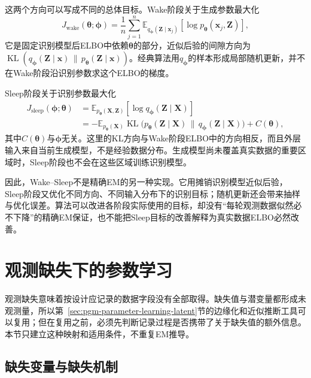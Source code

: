 这两个方向可以写成不同的总体目标。Wake阶段关于生成参数最大化
\begin{equation}
  J_{\mathrm{wake}}(\bm{\theta};\bm{\phi})
  =\frac{1}{n}\sum_{j=1}^n
    \mathbb{E}_{q_{\bm{\phi}}(\bm{Z}\mid\bm{x}_j)}
      [\log p_{\bm{\theta}}(\bm{x}_j,\bm{Z})],
  \label{eq:pgm-parameter-learning-wake-objective}
\end{equation}
它是固定识别模型后ELBO中依赖$\bm{\theta}$的部分，近似后验的间隙方向为$\operatorname{KL}(q_{\bm{\phi}}(\bm{Z}\mid\bm{x})\,\|\,p_{\bm{\theta}}(\bm{Z}\mid\bm{x}))$。经典算法用$q_{\bm{\phi}}$的样本形成局部随机更新，并不在Wake阶段沿识别参数求这个ELBO的梯度。

Sleep阶段关于识别参数最大化
\begin{equation}
  \begin{aligned}
    J_{\mathrm{sleep}}(\bm{\phi};\bm{\theta})
      &=\mathbb{E}_{p_{\bm{\theta}}(\bm{X},\bm{Z})}
          [\log q_{\bm{\phi}}(\bm{Z}\mid\bm{X})]\\
      &=-\mathbb{E}_{p_{\bm{\theta}}(\bm{X})}
          \operatorname{KL}\bigl(
            p_{\bm{\theta}}(\bm{Z}\mid\bm{X})
            \,\|\,q_{\bm{\phi}}(\bm{Z}\mid\bm{X})\bigr)+C(\bm{\theta}),
  \end{aligned}
  \label{eq:pgm-parameter-learning-sleep-objective}
\end{equation}
其中$C(\bm{\theta})$与$\bm{\phi}$无关。这里的KL方向与Wake阶段ELBO中的方向相反，而且外层输入来自当前生成模型，不是经验数据分布。生成模型尚未覆盖真实数据的重要区域时，Sleep阶段也不会在这些区域训练识别模型。

因此，Wake--Sleep不是精确EM的另一种实现。它用摊销识别模型近似后验，Sleep阶段又优化不同方向、不同输入分布下的识别目标；随机更新还会带来抽样与优化误差。算法可以改进各阶段实际使用的目标，却没有“每轮观测数据似然必不下降”的精确EM保证，也不能把Sleep目标的改善解释为真实数据ELBO必然改善。

\section{观测缺失下的参数学习}
\label{sec:pgm-parameter-learning-incomplete}

观测缺失意味着按设计应记录的数据字段没有全部取得。缺失值与潜变量都形成未观测量，所以第~\ref{sec:pgm-parameter-learning-latent}节的边缘化和近似推断工具可以复用；但在复用之前，必须先判断记录过程是否携带了关于缺失值的额外信息。本节只建立这种映射和适用条件，不重复EM推导。

\subsection{缺失变量与缺失机制}
\label{sec:pgm-parameter-learning-missingness}

